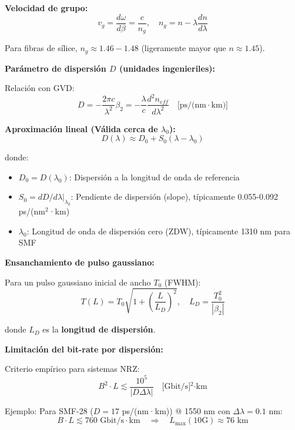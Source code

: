 \documentclass[11pt,a4paper]{article}
\begin{document}
\textbf{Velocidad de grupo:}
\begin{equation}
    v_g = \frac{d\omega}{d\beta} = \frac{c}{n_g}, \quad n_g = n - \lambda\frac{dn}{d\lambda}
\end{equation}

Para fibras de sílice, $n_g \approx 1.46-1.48$ (ligeramente mayor que $n \approx 1.45$).

\textbf{Parámetro de dispersión $D$ (unidades ingenieriles):}

Relación con GVD:
\begin{equation}
    D = -\frac{2\pi c}{\lambda^2}\beta_2 = -\frac{\lambda}{c}\frac{d^2n_{eff}}{d\lambda^2} \quad \text{[ps/(nm}·\text{km)]}
\end{equation}

\textbf{Aproximación lineal (Válida cerca de $\lambda_0$):}
\begin{equation}
    D(\lambda) \approx D_0 + S_0(\lambda - \lambda_0)
\end{equation}

donde:
\begin{itemize}
    \item $D_0 = D(\lambda_0)$: Dispersión a la longitud de onda de referencia
    \item $S_0 = dD/d\lambda|_{\lambda_0}$: Pendiente de dispersión (slope), típicamente 0.055-0.092 ps/(nm$^2$·km)
    \item $\lambda_0$: Longitud de onda de dispersión cero (ZDW), típicamente 1310 nm para SMF
\end{itemize}

\textbf{Ensanchamiento de pulso gaussiano:}

Para un pulso gaussiano inicial de ancho $T_0$ (FWHM):
\begin{equation}
    T(L) = T_0\sqrt{1 + \left(\frac{L}{L_D}\right)^2}, \quad L_D = \frac{T_0^2}{|\beta_2|}
\end{equation}

donde $L_D$ es la \textbf{longitud de dispersión}.

\textbf{Limitación del bit-rate por dispersión:}

Criterio empírico para sistemas NRZ:
\begin{equation}
    B^2 \cdot L \lesssim \frac{10^5}{|D\Delta\lambda|} \quad \text{[Gbit/s]$^2$·km}
\end{equation}

Ejemplo: Para SMF-28 ($D = 17$ ps/(nm·km)) @ 1550 nm con $\Delta\lambda = 0.1$ nm:
\begin{equation}
    B \cdot L \lesssim 760 \text{ Gbit/s}·\text{km} \quad \Rightarrow \quad L_{\text{max}}(10\text{G}) \approx 76 \text{ km}
\end{equation}
\end{document}
